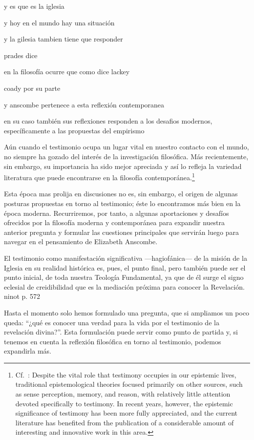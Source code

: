y es que es la iglesia

y hoy en el mundo hay una situación

y la gilesia tambien tiene que responder

prades dice

en la filosofía ocurre que
como dice lackey

coady por su parte

y anscombe pertenece a esta reflexión contemporanea

en su caso también sus reflexiones responden a los desafios modernos,
específicamente a las propuestas del empirismo

Aún cuando el testimonio ocupa un lugar vital en nuestro contacto con el mundo,
no siempre ha gozado del interés de la investigación filosófica. Más
recientemente, sin embargo, su importancia ha sido mejor apreciada y así lo
refleja la variedad literatura que puede encontrarse en la filosofía
contemporánea.\footnote{Cf.~\cite[1]{lackeysosa2006eptest}: Despite the vital
  role that testimony occupies in our epistemic lives, traditional
  epistemological theories focused primarily on other sources, such as sense
  perception, memory, and reason, with relatively little attention devoted
  specifically to testimony. In recent years, however, the epistemic
  significance of testimony has been more fully appreciated, and the current
  literature has benefited from the publication of a considerable amount of
  interesting and innovative work in this area.}

Esta época mas prolija en discusiones no es, sin embargo, el origen de algunas
posturas propuestas en torno al testimonio; éste lo encontramos más bien en la
época moderna. Recurriremos, por tanto, a algunas aportaciones y desafíos
ofrecidos por la filosofía moderna y contemporánea para expandir nuestra
anterior pregunta y formular las cuestiones principales que servirán luego para
navegar en el pensamiento de Elizabeth Anscombe.

El testimonio como manifestación significativa ---hagiofánica--- de la misión de
la Iglesia en su realidad histórica es, pues, el punto final, pero también puede
ser el punto inicial, de toda nuestra Teología Fundamental, ya que de él surge
el signo eclesial de creidibilidad que es la mediación próxima para conocer la
Revelación. ninot p. 572

Hasta el momento solo hemos formulado una pregunta, que si ampliamos un poco
queda: \enquote{¿qué es conocer una verdad para la vida por el testimonio de la
  revelación divina?}. Esta formulación puede servir como punto de partida y, si
tenemos en cuenta la reflexión filosófica en torno al testimonio, podemos
expandirla más.

